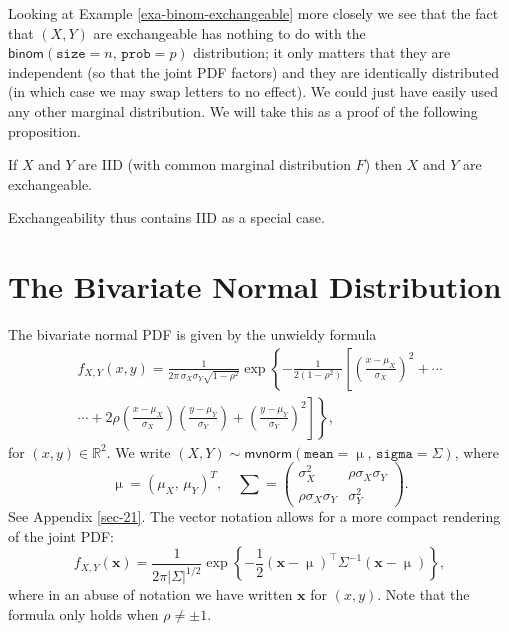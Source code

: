 \documentclass[captions=tableheading]{scrbook}
\begin{document}
Looking at Example \ref{exa-binom-exchangeable} more closely we see that the fact that \((X,Y)\) are exchangeable has nothing to do with the \(\mathsf{binom}(\mathtt{size}=n,\,\mathtt{prob}=p)\) distribution; it only matters that they are independent (so that the joint PDF factors) and they are identically distributed (in which case we may swap letters to no effect). We could just have easily used any other marginal distribution. We will take this as a proof of the following proposition.

\begin{prop}
If \(X\) and \(Y\) are IID (with common marginal distribution \(F\)) then \(X\) and \(Y\) are exchangeable. 
\end{prop}

Exchangeability thus contains IID as a special case. 
\section{The Bivariate Normal Distribution}
\label{sec-7-6}
\label{sec-The-Bivariate-Normal}


The bivariate normal PDF is given by the unwieldy formula
\begin{multline}
f_{X,Y}(x,y)=\frac{1}{2\pi\,\sigma_{X}\sigma_{Y}\sqrt{1-\rho^{2}}}\exp\left\{ -\frac{1}{2(1-\rho^{2})}\left[\left(\frac{x-\mu_{X}}{\sigma_{X}}\right)^{2}+\cdots\right.\right.\\
\left.\left.\cdots+2\rho\left(\frac{x-\mu_{X}}{\sigma_{X}}\right)\left(\frac{y-\mu_{Y}}{\sigma_{Y}}\right)+\left(\frac{y-\mu_{Y}}{\sigma_{Y}}\right)^{2}\right]\right\} ,
\end{multline}
for \((x,y)\in\mathbb{R}^{2}\). We write \((X,Y)\sim\mathsf{mvnorm}(\mathtt{mean}=\upmu,\,\mathtt{sigma}=\Sigma)\), where
\begin{equation}
\upmu=(\mu_{X},\,\mu_{Y})^{T},\quad \sum=\left(
\begin{array}{cc}
\sigma_{X}^{2} & \rho\sigma_{X}\sigma_{Y}\\
\rho\sigma_{X}\sigma_{Y} & \sigma_{Y}^{2}
\end{array}
\right).
\end{equation}
See Appendix \ref{sec-21}. The vector notation allows for a more compact rendering of the joint PDF:
\begin{equation}
f_{X,Y}(\mathbf{x})=\frac{1}{2\pi\left|\Sigma\right|^{1/2}}\exp\left\{ -\frac{1}{2}\left(\mathbf{x}-\upmu\right)^{\top}\Sigma^{-1}\left(\mathbf{x}-\upmu\right)\right\} ,
\end{equation}
where in an abuse of notation we have written \(\mathbf{x}\) for \((x,y)\). Note that the formula only holds when \(\rho\neq\pm1\).
\end{document}
